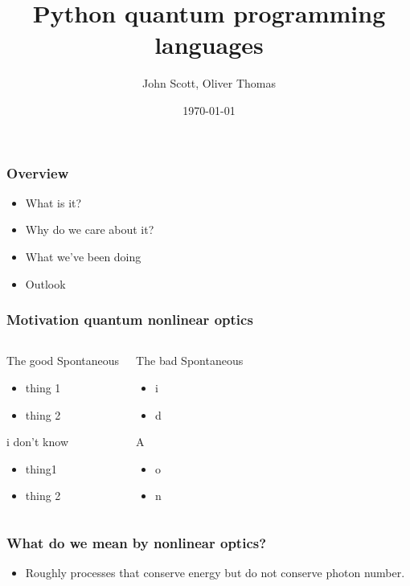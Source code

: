\documentclass{beamer}
\title{Python quantum programming languages}
\author{John Scott, Oliver Thomas}
\institute{Quantum Engineering CDT \\ University of Bristol}
\date{\today}
\begin{document}
\frame{\titlepage}

\begin{frame}
\frametitle{Overview}
\begin{itemize}
    \item What is it?
    \item Why do we care about it?
    \item What we've been doing
    \item Outlook
\end{itemize}
\end{frame}

\begin{frame}
\frametitle{Motivation quantum nonlinear optics}
\begin{columns}
    \begin{block}{The good}
    Spontaneous 
    \begin{itemize}
        \item thing 1 
        \item thing 2 
    \end{itemize}
    i don't know
    \begin{itemize}
        \item thing1  
        \item thing 2
    \end{itemize}
    \end{block}
%
    \begin{block}{The bad}
        Spontaneous 
        \begin{itemize}
            \item i 
            \item d
        \end{itemize}
        A
        \begin{itemize}
            \item o
            \item n
        \end{itemize}
        \end{block}
\end{columns}
\end{frame}

\begin{frame}
\frametitle{What do we mean by nonlinear optics?}
\begin{itemize} 
    \item Roughly processes that conserve energy but do not conserve photon number. 
\end{itemize}
\end{frame}
\end{document}

